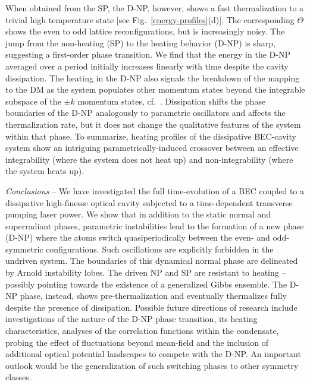 \documentclass[aps,prl,twocolumn,superscriptaddress,groupedaddress]{revtex4}  %
\begin{document}
{{When obtained from the SP, the D-NP, however, shows a fast thermalization to a trivial high temperature state [see Fig.~\ref{energy-profiles}(d)].  
The corresponding $\Theta$ shows the even to odd lattice reconfigurations, but is increasingly noisy.
The jump from the non-heating (SP) to the heating behavior (D-NP) is sharp, suggesting a first-order phase transition. 
We find that the energy in the D-NP averaged over a period initially increases linearly with time despite the cavity dissipation. 
The heating in the D-NP also signals the breakdown of the mapping to the DM as the system populates other momentum states beyond the integrable subspace of the $ \pm k$ momentum states, 
cf.~\cite{PRLAxel}.
Dissipation shifts the phase boundaries of the D-NP analogously to parametric oscillators and affects the thermalization rate, but it does not change the qualitative features of the system within that phase. 
To summarize, heating profiles of the dissipative BEC-cavity  system  show  an intriguing parametrically-induced crossover between  an effective integrability (where the system does not heat
up)  and non-integrability (where the system heats up). 






\textit{Conclusions} -- 
We have investigated the full time-evolution of a BEC coupled to a dissipative high-finesse optical cavity subjected to a time-dependent transverse pumping laser power. 
We show that in addition to the static normal and superradiant phases, 
parametric instabilities  lead to the formation of a new phase (D-NP) where the atoms switch quasiperiodically between the  even- and odd-symmetric configurations. 
Such oscillations are explicitly forbidden in the undriven system. The boundaries of this dynamical normal phase are delineated by Arnold instability lobes. 
The driven NP and SP are resistant to heating -- possibly pointing towards the existence of a generalized Gibbs ensemble. 
The D-NP phase, instead, shows pre-thermalization and eventually thermalizes fully despite the presence of dissipation. 
Possible future directions of research include  investigations of  the nature of the D-NP phase transition, its heating characteristics, analyses of the correlation functions within the condensate, 
probing the effect of fluctuations beyond mean-field and the inclusion of additional optical potential landscapes to compete with the D-NP.
An important outlook would be the generalization of such switching phases to other symmetry classes.


}}
\end{document}
